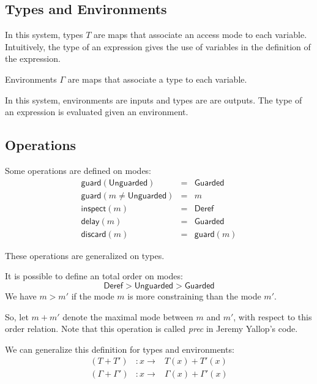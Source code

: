 \documentclass{article}
\newcommand{\Deref}{\mathsf{Deref}}
\newcommand{\Unguarded}{\mathsf{Unguarded}}
\newcommand{\Guarded}{\mathsf{Guarded}}
\newcommand{\inspect}{\mathsf{inspect}}
\newcommand{\guard}{\mathsf{guard}}
\newcommand{\discard}{\mathsf{discard}}
\newcommand{\delay}{\mathsf{delay}}
\begin{document}
\subsection{Types and Environments}
In this system, types $T$ are maps that associate an access mode to each
variable.
Intuitively, the type of an expression gives the use of variables in the
definition of the expression.

Environments $\Gamma$ are maps that associate a type to each variable.

In this system, environments are inputs and types are are outputs. The type of
an expression is evaluated given an environment.

\subsection{Operations}
Some operations are defined on modes:
\begin{displaymath}
  \begin{array}{lll}
    \guard(\Unguarded)              & = & \Guarded \\
    \guard(m \neq \Unguarded)       & = & m        \\
    \inspect(m)                     & = & \Deref   \\
    \delay(m)                       & = & \Guarded \\
    \discard(m)                     & = & \guard(m)
  \end{array}
\end{displaymath}

These operations are generalized on types.


It is possible to define an total order on modes:
$$\Deref > \Unguarded > \Guarded$$
We have $m > m'$ if the mode $m$ is more constraining than the mode $m'$.

So, let $m + m'$ denote the maximal mode between $m$ and $m'$, with respect to
this order relation. Note that this operation is called \textit{prec} in
Jeremy Yallop's code.

We can generalize this definition for types and environments:
\begin{displaymath}
  \begin{array}{lll}
    (T + T')           & : x \rightarrow & T(x) + T'(x) \\
    (\Gamma + \Gamma') & : x \rightarrow & \Gamma(x) + \Gamma'(x)
  \end{array}
\end{displaymath}
\end{document}
